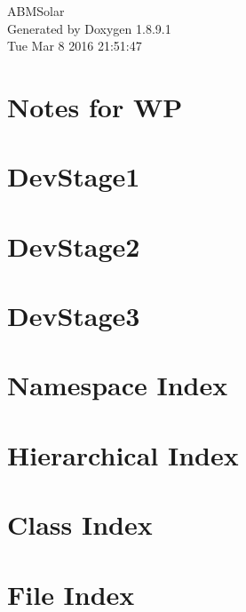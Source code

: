 \documentclass[twoside]{book}
\newcommand{\+}{\discretionary{\mbox{\scriptsize$\hookleftarrow$}}{}{}}
\newcommand{\clearemptydoublepage}{%
  \newpage{\pagestyle{empty}\cleardoublepage}%
}
\begin{document}
\hypersetup{pageanchor=false,
             bookmarks=true,
             bookmarksnumbered=true,
             pdfencoding=unicode
            }
\begin{titlepage}
\vspace*{7cm}
\begin{center}%
{\Large A\+B\+M\+Solar }\\
\vspace*{1cm}
{\large Generated by Doxygen 1.8.9.1}\\
\vspace*{0.5cm}
{\small Tue Mar 8 2016 21:51:47}\\
\end{center}
\end{titlepage}
\clearemptydoublepage
\tableofcontents
\clearemptydoublepage
{}
\hypersetup{pageanchor=true}

\chapter{Notes for W\+P}
\label{wp}
\hypertarget{wp}{}

\chapter{Dev\+Stage1}
\label{_dev_stage1}
\hypertarget{_dev_stage1}{}

\chapter{Dev\+Stage2}
\label{_dev_stage2}
\hypertarget{_dev_stage2}{}

\chapter{Dev\+Stage3}
\label{_dev_stage3}
\hypertarget{_dev_stage3}{}

\chapter{Namespace Index}

\chapter{Hierarchical Index}

\chapter{Class Index}

\chapter{File Index}

\end{document}
